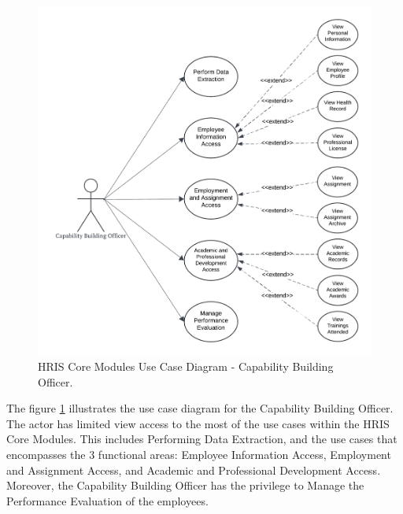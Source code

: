     \begin{figure}[H]
        \centering
        \includegraphics[width=0.9\linewidth]{figures/images/diagrams/usecase/use-case-basic-7.png}
        \caption{HRIS Core Modules Use Case Diagram - Capability Building Officer.}
        \label{fig:use-case-basic-7}
    \end{figure}

    The figure \ref{fig:use-case-basic-7} illustrates the use case diagram for the Capability Building Officer. The actor has limited view access to the most of the use cases within the HRIS Core Modules. This includes Performing Data Extraction, and the use cases that  encompasses the 3 functional areas: Employee Information Access, Employment and Assignment Access, and Academic and Professional Development Access. Moreover, the Capability Building Officer has the privilege to Manage the Performance Evaluation of the employees.

